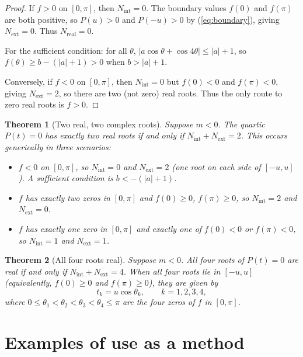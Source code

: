 \documentclass[12pt]{article}
\newtheorem{theorem}{Theorem}
\theoremstyle{definition}
\theoremstyle{remark}
\begin{document}
\begin{proof}
If $f > 0$ on $[0,\pi]$, then $N_{\mathrm{int}} = 0$. The boundary values $f(0)$ and $f(\pi)$ are both positive, so $P(u) > 0$ and $P(-u) > 0$ by (\ref{eq:boundary}), giving $N_{\mathrm{ext}} = 0$. Thus $N_{\mathrm{real}} = 0$.

For the sufficient condition: for all $\theta$, $|a\cos\theta + \cos 4\theta| \leq |a| + 1$, so $f(\theta) \geq b - (|a|+1) > 0$ when $b > |a| + 1$.

Conversely, if $f < 0$ on $[0,\pi]$, then $N_{\mathrm{int}} = 0$ but $f(0) < 0$ and $f(\pi) < 0$, giving $N_{\mathrm{ext}} = 2$, so there are two (not zero) real roots. Thus the only route to zero real roots is $f > 0$.
\end{proof}

\begin{theorem}[Two real, two complex roots]\label{thm:two_real}
Suppose $m < 0$. The quartic $P(t) = 0$ has exactly two real roots if and only if $N_{\mathrm{int}} + N_{\mathrm{ext}} = 2$. This occurs generically in three scenarios:
\begin{itemize}
\item[(a)] $f < 0$ on $[0,\pi]$, so $N_{\mathrm{int}} = 0$ and $N_{\mathrm{ext}} = 2$ (one root on each side of $[-u,u]$). A sufficient condition is $b < -(|a|+1)$.
\item[(b)] $f$ has exactly two zeros in $[0,\pi]$ and $f(0) \geq 0$, $f(\pi) \geq 0$, so $N_{\mathrm{int}} = 2$ and $N_{\mathrm{ext}} = 0$.
\item[(c)] $f$ has exactly one zero in $[0,\pi]$ and exactly one of $f(0) < 0$ or $f(\pi) < 0$, so $N_{\mathrm{int}} = 1$ and $N_{\mathrm{ext}} = 1$.
\end{itemize}
\end{theorem}

\begin{theorem}[All four roots real]\label{thm:four_real}
Suppose $m < 0$. All four roots of $P(t) = 0$ are real if and only if $N_{\mathrm{int}} + N_{\mathrm{ext}} = 4$. When all four roots lie in $[-u,u]$ (equivalently, $f(0) \geq 0$ and $f(\pi) \geq 0$), they are given by
\[
t_k = u\cos\theta_k, \qquad k = 1, 2, 3, 4,
\]
where $0 \leq \theta_1 < \theta_2 < \theta_3 < \theta_4 \leq \pi$ are the four zeros of $f$ in $[0,\pi]$.
\end{theorem}

\section{Examples of use as a method}
\end{document}
